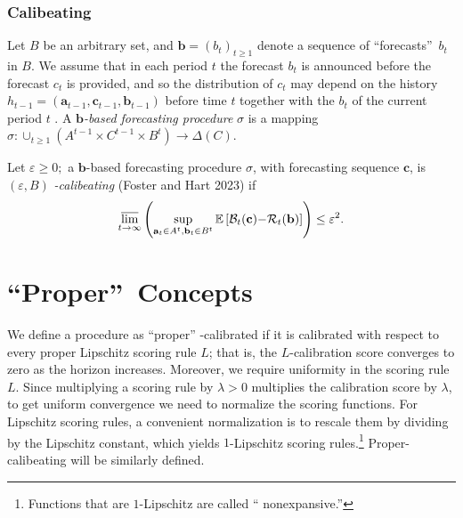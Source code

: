 \documentclass[12pt,a4paper,notitlepage]{article}
\begin{document}
\subsubsection{Calibeating\label{susus:calibeating}}

Let $B$ be an arbitrary set, and $\mathbf{b}=(b_{t})_{t\geq 1}$ denote a
sequence of \textquotedblleft forecasts\textquotedblright\ $b_{t}$ in $B$.
We assume that in each period $t$ the forecast $b_{t}$ is announced before
the forecast $c_{t}$ is provided, and so the distribution of $c_{t}$ may
depend on the history $h_{t-1}=(\mathbf{a}_{t-1},\mathbf{c}_{t-1},\mathbf{b}%
_{t-1})$ before time $t$ together with the $b_{t}$ of the current period $t$%
. A $\mathbf{b}$\emph{-based forecasting procedure} $\sigma $ is a mapping%
\emph{\ }$\sigma :\cup _{t\geq 1}(A^{t-1}\times C^{t-1}\times
B^{t})\rightarrow \Delta (C)$.

Let $\varepsilon \geq 0;$ a $\mathbf{b}$-based forecasting procedure $\sigma 
$, with forecasting sequence $\mathbf{c}$, is $(\varepsilon ,B)$\emph{%
-calibeating} (Foster and Hart 2023) if%
\begin{equation}
\varlimsup_{t\rightarrow \infty }\left( \sup_{\mathbf{a}_{t}\in A^{t},%
\mathbf{b}_{t}\in B^{t}}\mathbb{E}\left[ \mathcal{B}_{t}(\mathbf{c})\mathbf{-%
}\mathcal{R}_{t}(\mathbf{b})\right] \right) \leq \varepsilon ^{2}.
\label{eq:calibeat-def-R1}
\end{equation}

\section{\textquotedblleft Proper\textquotedblright\ Concepts\label{s:proper}%
}

We define a procedure as \textquotedblleft proper\textquotedblright
-calibrated if it is calibrated with respect to every proper Lipschitz
scoring rule $L$; that is, the $L$-calibration score converges to zero as
the horizon increases. Moreover, we require uniformity in the scoring rule $%
L $. Since multiplying a scoring rule by $\lambda >0$ multiplies the
calibration score by $\lambda $, to get uniform convergence we need to
normalize the scoring functions. For Lipschitz scoring rules, a convenient
normalization is to rescale them by dividing by the Lipschitz constant,
which yields $1$-Lipschitz scoring rules.\footnote{%
Functions that are $1$-Lipschitz are called \textquotedblleft
nonexpansive.\textquotedblright} Proper-calibeating will be similarly
defined.
\end{document}

